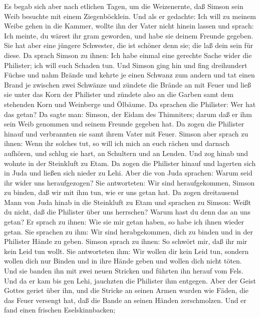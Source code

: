  Es begab sich aber nach etlichen Tagen, um die Weizenernte,
daß Simson sein Weib besuchte mit einem Ziegenböcklein. Und als er
gedachte: Ich will zu meinem Weibe gehen in die Kammer, wollte ihn der
Vater nicht hinein lassen  und sprach: Ich meinte, du wärest
ihr gram geworden, und habe sie deinem Freunde gegeben. Sie hat aber
eine jüngere Schwester, die ist schöner denn sie; die laß dein sein für
diese.  Da sprach Simson zu ihnen: Ich habe einmal eine
gerechte Sache wider die Philister; ich will euch Schaden tun.
 Und Simson ging hin und fing dreihundert Füchse und nahm
Brände und kehrte je einen Schwanz zum andern und tat einen Brand je
zwischen zwei Schwänze  und zündete die Brände an mit Feuer
und ließ sie unter das Korn der Philister und zündete also an die Garben
samt dem stehenden Korn und Weinberge und Ölbäume.  Da
sprachen die Philister: Wer hat das getan? Da sagte man: Simson, der
Eidam des Thimniters; darum daß er ihm sein Weib genommen und seinem
Freunde gegeben hat. Da zogen die Philister hinauf und verbrannten sie
samt ihrem Vater mit Feuer.  Simson aber sprach zu ihnen:
Wenn ihr solches tut, so will ich mich an euch rächen und darnach
aufhören,  und schlug sie hart, an Schultern und an Lenden.
Und zog hinab und wohnte in der Steinkluft zu Etam.  Da
zogen die Philister hinauf und lagerten sich in Juda und ließen sich
nieder zu Lehi.  Aber die von Juda sprachen: Warum seid ihr
wider uns heraufgezogen? Sie antworteten: Wir sind heraufgekommen,
Simson zu binden, daß wir mit ihm tun, wie er uns getan hat.
 Da zogen dreitausend Mann von Juda hinab in die Steinkluft
zu Etam und sprachen zu Simson: Weißt du nicht, daß die Philister über
uns herrschen? Warum hast du denn das an uns getan? Er sprach zu ihnen:
Wie sie mir getan haben, so habe ich ihnen wieder getan. 
Sie sprachen zu ihm: Wir sind herabgekommen, dich zu binden und in der
Philister Hände zu geben. Simson sprach zu ihnen: So schwört mir, daß
ihr mir kein Leid tun wollt.  Sie antworteten ihm: Wir
wollen dir kein Leid tun, sondern wollen dich nur Binden und in ihre
Hände geben und wollen dich nicht töten. Und sie banden ihn mit zwei
neuen Stricken und führten ihn herauf vom Fels.  Und da er
kam bis gen Lehi, jauchzten die Philister ihm entgegen. Aber der Geist
Gottes geriet über ihn, und die Stricke an seinen Armen wurden wie
Fäden, die das Feuer versengt hat, daß die Bande an seinen Händen
zerschmolzen.  Und er fand einen frischen Eselskinnbacken;
